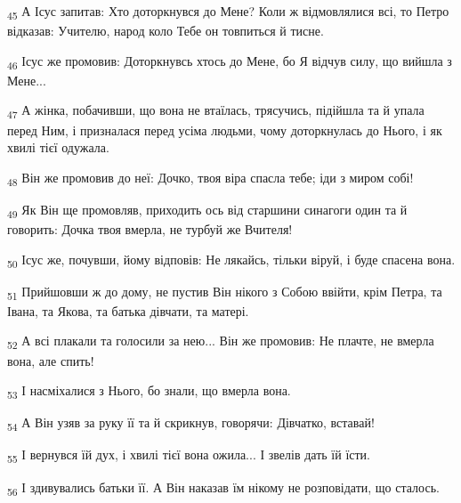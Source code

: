 \begin{tcolorbox}
\textsubscript{45} А Ісус запитав: Хто доторкнувся до Мене? Коли ж відмовлялися всі, то Петро відказав: Учителю, народ коло Тебе он товпиться й тисне.
\end{tcolorbox}
\begin{tcolorbox}
\textsubscript{46} Ісус же промовив: Доторкнувсь хтось до Мене, бо Я відчув силу, що вийшла з Мене...
\end{tcolorbox}
\begin{tcolorbox}
\textsubscript{47} А жінка, побачивши, що вона не втаїлась, трясучись, підійшла та й упала перед Ним, і призналася перед усіма людьми, чому доторкнулась до Нього, і як хвилі тієї одужала.
\end{tcolorbox}
\begin{tcolorbox}
\textsubscript{48} Він же промовив до неї: Дочко, твоя віра спасла тебе; іди з миром собі!
\end{tcolorbox}
\begin{tcolorbox}
\textsubscript{49} Як Він ще промовляв, приходить ось від старшини синагоги один та й говорить: Дочка твоя вмерла, не турбуй же Вчителя!
\end{tcolorbox}
\begin{tcolorbox}
\textsubscript{50} Ісус же, почувши, йому відповів: Не лякайсь, тільки віруй, і буде спасена вона.
\end{tcolorbox}
\begin{tcolorbox}
\textsubscript{51} Прийшовши ж до дому, не пустив Він нікого з Собою ввійти, крім Петра, та Івана, та Якова, та батька дівчати, та матері.
\end{tcolorbox}
\begin{tcolorbox}
\textsubscript{52} А всі плакали та голосили за нею... Він же промовив: Не плачте, не вмерла вона, але спить!
\end{tcolorbox}
\begin{tcolorbox}
\textsubscript{53} І насміхалися з Нього, бо знали, що вмерла вона.
\end{tcolorbox}
\begin{tcolorbox}
\textsubscript{54} А Він узяв за руку її та й скрикнув, говорячи: Дівчатко, вставай!
\end{tcolorbox}
\begin{tcolorbox}
\textsubscript{55} І вернувся їй дух, і хвилі тієї вона ожила... І звелів дать їй їсти.
\end{tcolorbox}
\begin{tcolorbox}
\textsubscript{56} І здивувались батьки її. А Він наказав їм нікому не розповідати, що сталось.
\end{tcolorbox}
